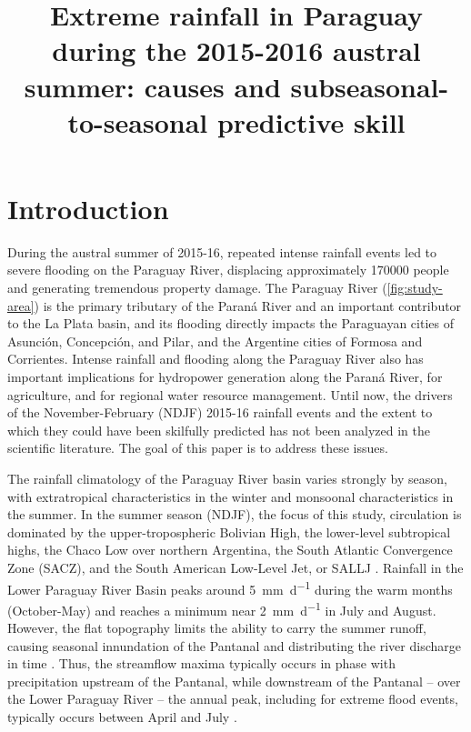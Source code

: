 \documentclass{ametsoc}
\title{Extreme rainfall in Paraguay during the 2015-2016 austral summer: causes and subseasonal-to-seasonal predictive skill}
\affiliation{Dept. of Earth and Environmental Engineering, Columbia University, 500 W. 120th St., New York, NY. USA \\ Columbia Water Center, Columbia University, 500 W. 120th St., New York, NY. USA}
\begin{document}
\maketitle


\section{Introduction}

During the austral summer of 2015-16, repeated intense rainfall events led to severe flooding on the Paraguay River, displacing approximately \num{170000} people \citep{BrackenridgeDFO} and generating tremendous property damage.
The Paraguay River (\cref{fig:study-area}) is the primary tributary of the Paran\'{a} River and an important contributor to the La Plata basin, and its flooding directly impacts the Paraguayan cities of Asunci\'{o}n, Concepci\'{o}n, and Pilar, and the Argentine cities of Formosa and Corrientes.
Intense rainfall and flooding along the Paraguay River also has important implications for hydropower generation along the Paran\'{a} River, for agriculture, and for regional water resource management.
Until now, the drivers of the November-February (NDJF) 2015-16 rainfall events and the extent to which they could have been skilfully predicted has not been analyzed in the scientific literature.
The goal of this paper is to address these issues.

The rainfall climatology of the Paraguay River basin varies strongly by season, with extratropical characteristics in the winter and monsoonal characteristics in the summer.
In the summer season (NDJF), the focus of this study, circulation is dominated by the upper-tropospheric Bolivian High, the lower-level subtropical highs, the Chaco Low over northern Argentina, the South Atlantic Convergence Zone (SACZ), and the South American Low-Level Jet, or SALLJ \citep{Grimm2009,Marengo:2012cm}.
Rainfall in the Lower Paraguay River Basin peaks around \SI{5}{\milli\meter\per\day} during the warm months (October-May) and reaches a minimum near \SI{2}{\milli\meter\per\day} in July and August.
However, the flat topography limits the ability to carry the summer runoff, causing seasonal innundation of the Pantanal and distributing the river discharge in time \citep{Bravo:2011et,Barros:2004bn}.
Thus, the streamflow maxima typically occurs in phase with precipitation upstream of the Pantanal, while downstream of the Pantanal -- over the Lower Paraguay River -- the annual peak, including for extreme flood events, typically occurs between April and July \citep{Barros:2004bn}.
\end{document}
